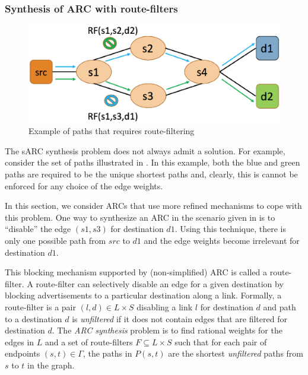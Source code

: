 \subsubsection{Synthesis of ARC with route-filters} \label{sec:routefilter}
\begin{figure}[!t] 
	\centering
	\includegraphics[width=0.7\columnwidth]{figures/diamond.eps}
	\caption{Example of paths that requires route-filtering} \label{fig:diamond}
\end{figure}
The sARC synthesis problem does not always admit a solution.
For example, consider the set of paths illustrated in . 
In this example, both the blue and green paths are required to be the unique shortest paths
and, clearly, this is cannot be enforced for any choice of the edge weights.

In this section, we consider ARCs that use more refined mechanisms to
cope with this problem.
One way to synthesize an ARC in the scenario 
given in 
is to ``disable'' the edge
$(s1, s3)$ for destination $d1$.
Using this technique, there is only one possible path from $src$ to $d1$ and the
edge weights become irrelevant for destination $d1$.


This blocking mechanism supported by (non-simplified)
ARC is called a route-filter. 
A route-filter  can selectively disable an
edge for a given destination by  blocking advertisements to a
particular destination along a link. 
Formally, a route-filter is a pair $(l,d)\in L\times S$
disabling a link $l$ for destination $d$
and path to a destination $d$ is \emph{unfiltered} 
if it does not contain edges that are filtered for destination $d$.
The \emph{ARC synthesis} problem
is to find rational weights for the edges in $L$
and a set of route-filters $F\subseteq L\times S$
 such that 
for each pair of endpoints $(s,t) \in \Gamma$, 
the paths in $P(s,t)$ are the shortest \emph{unfiltered} paths from $s$ to $t$ 
in the graph. 

